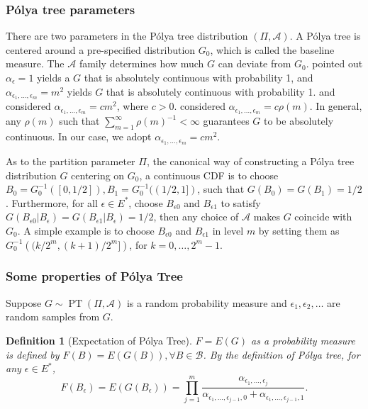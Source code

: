 \documentclass[12pt]{article}
\newtheorem{deff}[thm]{Definition}
\newcommand{\polya}{P\'{o}lya}
\DeclareMathOperator{\pt}{PT}
\begin{document}
\subsubsection{\polya{} tree parameters}
There are two parameters in the \polya{} tree distribution $(\Pi,
\mathcal{A})$. A \polya{} tree is centered around a
  pre-specified distribution $G_0$, which is called the baseline
  measure. The $\mathcal{A}$ family determines how much $G$ can
deviate from $G_0$. \citet{ferguson1974} pointed out $\alpha_{\epsilon} = 1
$ yields a $G$ that is absolutely continuous with probability 1, and
$\alpha_{\epsilon_1, \ldots, \epsilon_m} = m^2$ yields $G$ that is
absolutely continuous with probability 1. \citet{walker1999} and
\citet{paddock1999} considered $\alpha_{\epsilon_1, \ldots,
  \epsilon_m} = cm^2$, where $c > 0$. \citet{berger2001} considered
$\alpha_{\epsilon_1, \ldots, \epsilon_m} = c \rho(m)$. In general, any
$\rho(m) $ such that $\sum_{m=1}^{\infty} \rho(m)^{-1} < \infty$
guarantees $G$ to be absolutely continuous. In our case, we adopt
$\alpha_{\epsilon_1, \ldots, \epsilon_m} = cm^2$.

As to the partition parameter $\Pi$, the canonical way of constructing
a \polya{} tree distribution $G$ centering on $G_0$, a continuous CDF
is to choose $B_0 = G^{-1}_0 ([0, 1/2]), B_1 = G^{-1}_0 ((1/2,1])$,
such that $G(B_0) = G(B_1)= 1/2$. Furthermore, for all $\epsilon \in
E^{*}$, choose $B_{\epsilon 0 }$ and $B_{\epsilon 1}$ to satisfy
$G(B_{\epsilon 0 } |B_{\epsilon} ) = G(B_{\epsilon 1} | B_{\epsilon})
= 1/2 $, then any choice of $\mathcal{A} $ makes $G$ coincide with
$G_0$. A simple example is to choose $B_{\epsilon 0} $ and
$B_{\epsilon 1}$ in level $m$ by setting them as $G^{-1}_0 \left(
  (k/2^m, (k+1)/2^m] \right)$, for $k=0, \ldots, 2^m-1$.

\subsubsection{Some properties of \polya{} Tree}
Suppose $G \sim \pt (\Pi, \mathcal{A})$ is a random probability
measure and $\epsilon_1, \epsilon_2, \ldots$ are random samples from
$G$.

\begin{deff}[Expectation of \polya{} Tree]
  $F= E(G)$ as a probability measure is defined by $F(B) = E(G(B)),
  \forall B \in \mathcal{B}$. By the definition of \polya{} tree, for
  any $\epsilon \in E^{*}$,
  \begin{displaymath}
    F(B_{\epsilon})  = E(G(B_{\epsilon})) = \prod_{j=1}^m
    \frac{\alpha_{\epsilon_1, \ldots, \epsilon_j}}{\alpha_{\epsilon_1,
        \ldots, \epsilon_{j-1},0} + \alpha_{\epsilon_1, \ldots, \epsilon_{j-1},1}}.
  \end{displaymath}
\end{deff}
\end{document}
